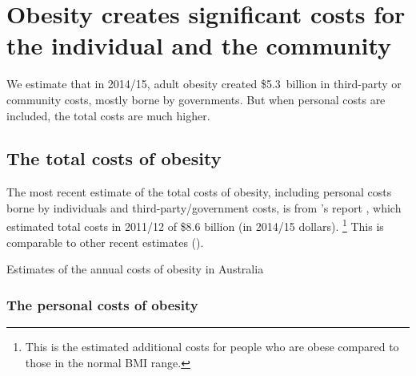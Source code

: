 \documentclass[embargoed]{grattan}
\begin{document}
\chapter{Obesity creates significant costs for the individual and the community}\label{obesity-creates-significant-costs-for-the-individual-and-society}

We estimate that in 2014/15, adult obesity created \$5.3~billion in third-party or community costs, mostly borne by governments.
But when personal costs are included, the total costs are much higher.

\section{The total costs of obesity }\label{the-total-costs-of-obesity}

The most recent estimate of the total costs of obesity, including personal costs borne by individuals and third-party/government costs, is from \citeauthor{PwC2015Weighingcostobesity}'s \citeyear{PwC2015Weighingcostobesity} report  ,
which estimated total costs in 2011/12 of \$8.6 billion (in 2014/15 dollars).%
\footnote{This is the estimated additional costs for people who are obese compared to those in the normal BMI range.} 
This is comparable to other recent estimates ().

\begin{table}
\caption{Estimates of the annual costs of obesity in Australia}\label{tbl:estimates-annual-costs-obesity-Australia}




\end{table}

\subsection{The personal costs of obesity }\label{the-personal-costs-of-obesity}
\end{document}
